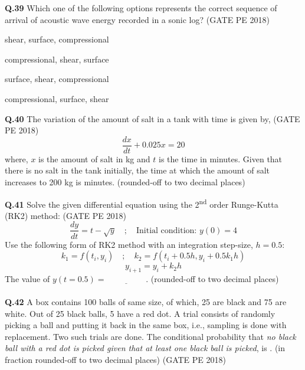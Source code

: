 \documentclass[12pt,a4paper]{article}
\begin{document}
\vspace{1cm}

\noindent\textbf{Q.39} Which one of the following options represents the correct sequence of arrival of acoustic wave energy recorded in a sonic log? \hfill (GATE PE 2018)

\vspace{0.3cm}
\begin{enumerate}[label=(\Alph*)] 
\begin{multicols}{2}
\item shear, surface, compressional  \item compressional, shear, surface \\ 
\item surface, shear, compressional  \item compressional, surface, shear \\
\end{multicols}
\end{enumerate}

\vspace{1cm}

\noindent\textbf{Q.40} The variation of the amount of salt in a tank with time is given by, \hfill (GATE PE 2018)
\[ \frac{dx}{dt} + 0.025x = 20 \]
where, $x$ is the amount of salt in kg and $t$ is the time in minutes. Given that there is no salt in the tank initially, the time at which the amount of salt increases to 200 kg is \underline{\hspace{2cm}} minutes. (rounded-off to two decimal places)

\pagebreak

\noindent\textbf{Q.41} Solve the given differential equation using the 2\textsuperscript{nd} order Runge-Kutta (RK2) method: \hfill (GATE PE 2018)
\[ \frac{dy}{dt} = t - \sqrt{y} \quad ; \quad \text{Initial condition: } y(0) = 4 \]
Use the following form of RK2 method with an integration step-size, $h = 0.5$:
\[ k_1 = f(t_i, y_i) \quad ; \quad k_2 = f(t_i + 0.5h, y_i + 0.5k_1 h) \]
\[ y_{i+1} = y_i + k_2 h \]
The value of $y(t = 0.5) = \underline{\hspace{2cm}}$. (rounded-off to two decimal places)\\\\

\noindent\textbf{Q.42} A box contains 100 balls of same size, of which, 25 are black and 75 are white. Out of 25 black balls, 5 have a red dot. A trial consists of randomly picking a ball and putting it back in the same box, i.e., sampling is done with replacement. Two such trials are done. The conditional probability that \textit{no black ball with a red dot is picked given that at least one black ball is picked}, is \underline{\hspace{2cm}}. (in fraction rounded-off to two decimal places) \hfill (GATE PE 2018)\\\\
\end{document}

